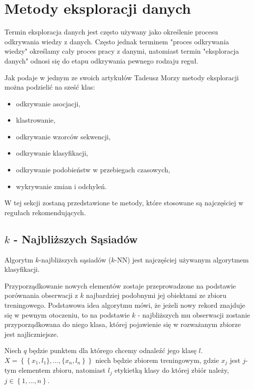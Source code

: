 \documentclass[12pt,a4paper]{report}
\newcommand{\set}[1]{\left\lbrace {#1} \right\rbrace}
\begin{document}
\section{Metody eksploracji danych}

Termin eksploracja danych jest często używany jako określenie procesu odkrywania wiedzy z danych. Często jednak terminem  "proces odkrywania wiedzy" określamy cały proces pracy z danymi, natomiast termin "eksploracja danych" odnosi się do etapu odkrywania pewnego rodzaju reguł.

Jak podaje w jednym ze swoich artykułów Tadeusz Morzy \citep{edpir} metody eksploracji można podzielić na sześć klas:
\begin{itemize}
\item odkrywanie asocjacji,
\item klastrowanie,
\item odkrywanie wzorców sekwencji,
\item odkrywanie klasyfikacji,
\item odkrywanie podobieństw w przebiegach czasowych,
\item wykrywanie zmian i odchyleń.
\end{itemize}

W tej sekcji zostaną przedstawione te metody, które stosowane są najczęściej w regułach rekomendujących.


\subsection{$k$ - Najbliższych Sąsiadów }{\citep[Sec 2.3.1]{rsh}}

Algorytm $k$-najbliższych sąsiadów ($k$-NN) jest najczęściej używanym algorytmem klasyfikacji.
 
Przyporządkowanie nowych elementów zostaje przeprowadzone na podstawie porównania obserwacji z $k$ najbardziej podobnymi jej obiektami ze zbioru treningowego. Podstawowa idea algorytmu mówi, że jeżeli nowy rekord znajduje się w pewnym otoczeniu, to na podstawie $k$ - najbliższych mu obserwacji zostanie przyporządkowana do niego klasa, której pojawienie się w rozważanym zbiorze jest najliczniejsze.

Niech $q$ będzie punktem dla którego chcemy odnaleźć jego klasę $l$. 
\\$X=\set{\set{x_1,l_1\},\ldots,\{x_n,l_n}}$ niech będzie zbiorem treningowym, gdzie $x_j$ jest $j$-tym elementem zbioru, natomiast $l_j$ etykietką klasy do której zbiór należy, $j\in\set{1,\ldots,n}$.
\end{document}
